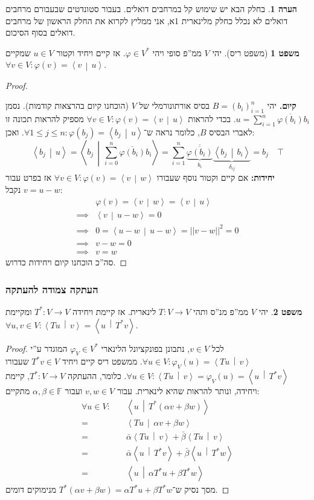 \documentclass[a4paper]{article}
\newcommand\vphi  {\varphi}
\newcommand\ra    {\rangle}
\newcommand\la    {\langle}
\newcommand\ol    {\overline}
\newcommand\sumni     {\sum_{i = 0}^{n}}
\newcommand\F         {\mathbb{F}}
\newcommand\co        {\colon}
\newcommand\norm[1]   {\left \vert \left \vert #1 \right \vert \right \vert}
\newcommand\mut [2]   {\left \la #1 \,\middle\vert\, #2 \right \ra}
\newcommand\ag        {\alpha}
\newcommand\bg        {\beta}
\newcommand\dg        {\delta}
\renewcommand\phi     {\varphi}
\theoremstyle{definition}
\newtheorem{Theorem}{\color{myblue}משפט}
\newtheorem{Remark}{\color{mycyan}הערה}
\newcommand\theo  [1] {\begin{Theorem}#1\end{Theorem}}
\newcommand\rmark [1] {\begin{Remark}#1\end{Remark}}
\begin{document}
	\rmark{בחלק הבא יש שימוש קל במרחבים דואלים. בעבור סטונדטים שבעבורם מרחבים דואלים לא נכלל כחלק מלינארית 1א, אני ממליץ לקרוא את החלק הראשון של מרחבים דואלים בסוף הסיכום. }
	
	
	\begin{Theorem}[משפט ריס]
		יהי $V$ ממ''פ סופי ויהי $\vphi \in V^*$. אז קיים ויחיד וקטור $u \in V$ שמקיים $\forall v \in V \co \vphi(v) = \mut{v}{u}$. 
	\end{Theorem}\begin{proof}\,
		
		\textbf{קיום. }יהי $B = (b_i)_{i = 1}^{n}$ בסיס אורתונורמלי של $V$ (הוכחנו קיום בהרצאות קודמות). נסמן $u = \sum_{i =1}^{n}\ol{\phi(b_i)} b_i$. בכדי להראות $\forall v \in V \co \phi(v) = \mut{v}{u}$ מספיק להראות תכונה זו לאברי הבסיס $B$, כלומר נראה ש־$\forall 1 \le j \le n \co \phi(b_j) = \mut{b_j}{u}$. ואכן: 
		\[ \mut{b_j}{u} = \mut{b_j}{\sumni \ol{\phi(b_i)}b_i} = \sum_{i = 1}^{n}\underbrace{\ol{\ol{\phi(b_i)}}}_{b_i}\underbrace{\mut{b_j}{b_i}}_{\dg_{ij}} = b_j \quad \top \]
		\textbf{יחידות: }אם קיים וקטור נוסף שעבורו $\forall v \in V \co \phi(v) = \mut{v}{w}$ אז בפרט עבור $v = u - w$ נקבל: 
		\begin{align*}
			         &\phi(v) = \mut{v}{w} = \mut{v}{u} \\
			\implies &\mut{v}{u - w} = 0 \\ 
			\implies &0 = \mut{u - w}{u - w} = \norm{v - w}^{2} = 0 \\ 
			\implies &v - w = 0 \\
			\implies &v = w
		\end{align*}
		סה''כ הוכחנו קיום ויחידות כדרוש. 
	\end{proof}
	
	\subsubsection{העתקה צמודה להעתקה}
	\theo{יהי $V$ ממ''פ מנ''ס ותהי $T \co V \to V$ לינארית. אז קיימת ויחידה $T^* \co V \to V$ ומקיימת $\forall u ,v \in V \co \mut{Tu}{v} = \mut{u}{T^*v}$. }
	
	\begin{proof}
		לכל $v \in V$, נתבונן בפונקציונל הלינארי $\phi_V \in V^*$ המוגדר ע''י $\forall u \in V \co \phi_V(u) = \mut{Tu}{v}$. ממשפט ריס קיים ויחיד $T^*v \in V$ שעבורו $\forall u \in V \co \mut{Tu}{v} = \phi_V(u) = \mut{u}{T^*v}$. כלומר, ההעתקה $T^* \co V \to V$, קיימת ויחידה, ונותר להראות שהיא לינארית. עבור $v, w \in V$ ועבור $\ag, \bg \in \F$ מתקיים: 
		\begin{align*}
			\forall u \in V \co \quad & \mut{u}{T^* (\ag v + \bg w)} \\
			= &\mut{Tu}{\ag v + \bg w} \\
			= &\bar \ag \mut{Tu}{v} + \bar \bg \mut{Tu}{v} \\ 
			= &\bar \ag \mut{u}{T^* v} + \bar \bg \mut{u}{T^*w} \\
			= &\mut{u}{\ag T^*u + \bg T^*w}
		\end{align*}
		מסך נסיק ש־$T^*(\ag v + \bg w) = \ag T^* u + \bg T^* w$ מנימוקים דומים. 
	\end{proof}
	
\end{document}

